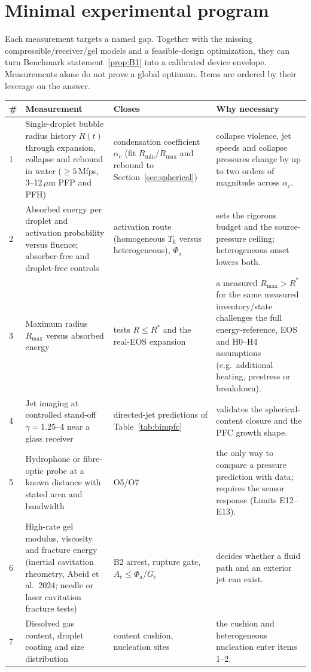 \section{Minimal experimental program}\label{sec:program}
Each measurement targets a named gap. Together with the missing compressible/receiver/gel models
and a feasible-design optimization, they can turn Benchmark statement~\ref{prop:B1} into a
calibrated device envelope. Measurements alone do not prove a global optimum.
Items are ordered by their leverage on the answer.
\begin{center}\small
\begin{longtable}{p{}p{}p{}p{}}
\toprule \# & Measurement & Closes & Why necessary\\\midrule\endhead
1 & Single-droplet bubble radius history $R(t)$ through expansion, collapse and rebound in water
($\ge5$\,Mfps, 3--12\,$\mu$m PFP and PFH) & condensation coefficient $\alpha_{\mathrm c}$ (fit $R_{\min}/R_{\max}$ and
rebound to Section~\ref{sec:spherical}) & collapse violence, jet speeds and collapse pressures change by up to two
orders of magnitude across $\alpha_{\mathrm c}$.\\
2 & Absorbed energy per droplet and activation probability versus fluence; absorber-free and droplet-free
controls & activation route (homogeneous $T_{\mathrm k}$ versus heterogeneous), $\Phi_{\mathrm a}$ & sets the rigorous
budget and the source-pressure ceiling; heterogeneous onset lowers both.\\
3 & Maximum radius $R_{\max}$ versus absorbed energy & tests $R\le R^*$ and the real-EOS expansion & a measured
$R_{\max}>R^*$ for the same measured inventory/state challenges the full energy-reference,
EOS and H0--H4 assumptions (e.g.\ additional heating, prestress or breakdown).\\
4 & Jet imaging at controlled stand-off $\gamma=1.25$--4 near a glass receiver & directed-jet predictions of
Table~\ref{tab:bimpfc} & validates the spherical-content closure and the PFC growth shape.\\
5 & Hydrophone or fibre-optic probe at a known distance with stated area and bandwidth & O5/O7 & the only way to
compare a pressure prediction with data; requires the sensor response (Limits E12--E13).\\
6 & High-rate gel modulus, viscosity and fracture energy (inertial cavitation rheometry, Abeid et al.\ 2024; needle
or laser cavitation fracture tests) & B2 arrest, rupture gate, $A_{\mathrm c}\le\Phi_{\mathrm a}/G_{\mathrm c}$ & decides whether a
fluid path and an exterior jet can exist.\\
7 & Dissolved gas content, droplet coating and size distribution & content cushion, nucleation sites & the cushion
and heterogeneous nucleation enter items 1--2.\\
\bottomrule
\end{longtable}
\end{center}


